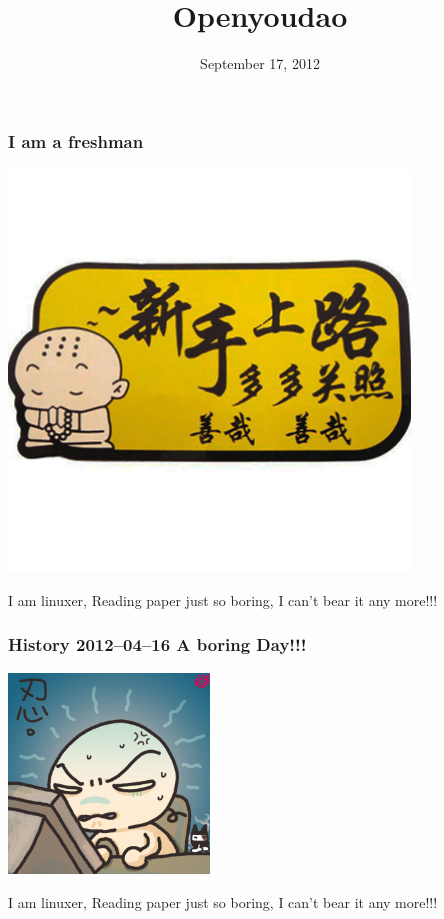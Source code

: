 \documentclass[10pt]{beamer}
\title{Openyoudao}
\date{September 17, 2012}
\begin{document}
\begin{frame}[plain]
  \titlepage
\end{frame}

\begin{frame}
  \frametitle{\Large{I am a freshman}}
\begin{center} 
  \includegraphics[width=0.8\textwidth]{newer.jpg}
  
\end{center}
\medskip
\quad
\qquad

I am linuxer, Reading paper just so boring, I can't bear it any more!!!
\end{frame}

\begin{frame}
  \frametitle{\Large{History 2012--04--16 A boring Day!!!}}

\begin{center} 
  \includegraphics[width=0.4\textwidth]{pic1.jpg}
\end{center}
\medskip
\quad
\qquad

I am linuxer, Reading paper just so boring, I can't bear it any more!!!
\end{frame}
\end{document}
